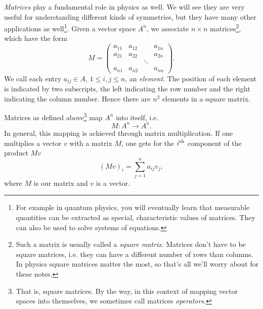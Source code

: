 {\it Matrices} play a fundamental role in physics as well.
We will see they are very useful for understanding different kinds of
symmetries, but they have many other applications as well\footnote{For example
in quantum physics, you will eventually learn that measurable quantities can be
extracted as special, characteristic values of matrices. They can also be used
to solve systems of equations.}. Given a vector space $A^n$, we associate
$n\times n$ matrices\footnote{Such a matrix is usually called a {\it square
matrix}. Matrices don't have to be square matrices, i.e. they can have a
different number of rows than columns. In physics square
matrices matter the most, so that's all we'll worry about for these notes.}, 
which have the form
\begin{equation}\label{eq:basicMatrix}
  M=\left(\begin{array}{cccc}
          a_{11}   & a_{12} &       & a_{1n}\\
          a_{21}   & a_{22} &       & a_{2n}\\
                   &        & \ddots&       \\
          a_{n1}   & a_{n2} &       & a_{nn}
            \end{array}\right). 
\end{equation}
We call each entry $a_{ij}\in A$, $1\leq i,j\leq n$, an {\it element}. The position
of each element is indicated by two subscripts, the left
indicating the row number and the right indicating the column number.
Hence there are $n^2$ elements in a square matrix.

Matrices as defined above\footnote{That is, square matrices. By the way,
in this context of mapping vector spaces into themselves, we sometimes
call matrices {\it operators}.} map $A^n$ into itself, i.e.
\begin{equation}\label{eq:operatorDef}
  M:A^n\to A^n.
\end{equation}
In general, this mapping is achieved through matrix multiplication. If one
multiplies a vector $v$ with a matrix $M$, one gets for the $i{}^{\rm th}$ component
of the product $Mv$
\begin{equation}\label{eq:matTimesVec}
  (Mv)_i=\sum_{j=1}^n a_{ij}v_j,
\end{equation}
where $M$ is our matrix and $v$ is a vector. 

